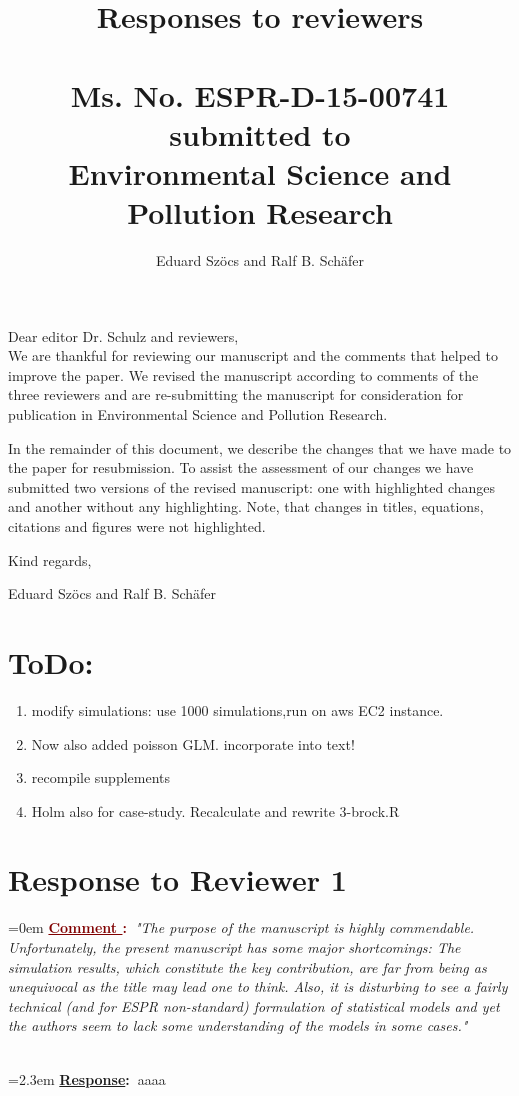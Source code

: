 \documentclass[12pt]{article}
\newcounter{cN}
\newcommand{\comment}[1]{
	\vspace{2em} 
	\refstepcounter{cN} %
	\noindent \hangindent=0em \textbf{\textcolor{Maroon}{\uline{Comment \thecN}:~}}\emph{"#1"}
	}
\newcommand{\response}[1]{
	\\[0.25em] 
	\hangindent=2.3em \textbf{\textcolor{NavyBlue}{\uline{Response}:~}}#1 
	}
\begin{document}
\title{Responses to reviewers\\~\\Ms. No. ESPR-D-15-00741\\submitted to\\Environmental Science and Pollution Research}

\author{Eduard Szöcs and Ralf B. Schäfer}

\maketitle
\noindent Dear editor Dr. Schulz  and reviewers,\\

We are thankful for reviewing our manuscript and the comments that helped to improve the paper. 
We revised the manuscript according to comments of the three reviewers and are re-submitting the manuscript for consideration for publication in Environmental Science and Pollution Research. 

In the remainder of this document, we describe the changes that we have made to the paper for resubmission. 
To assist the assessment of our changes we have submitted two versions of the revised manuscript: one with highlighted changes and another without any highlighting. 
Note, that changes in titles, equations, citations and figures were not highlighted.

\vspace{2em}
\hfill Kind regards,

\hfill Eduard Szöcs and Ralf B. Schäfer

\newpage
\section{ToDo:}
\begin{enumerate}
	\item modify simulations: use 1000 simulations,run on aws EC2 instance.
	\item Now also added poisson GLM. incorporate into text!
	\item recompile supplements
	\item Holm also for case-study. Recalculate and rewrite 3-brock.R

\end{enumerate}


\section{Response to Reviewer 1}
\vspace{-2em}
\comment{The purpose of the manuscript is highly commendable. Unfortunately, the
present manuscript has some major shortcomings: The simulation results,
which constitute the key contribution, are far from being as unequivocal as
the title may lead one to think. Also, it is disturbing to see a fairly technical
(and for ESPR non-standard) formulation of statistical models and yet the
authors seem to lack some understanding of the models in some cases.}
\response{aaaa}
\end{document}

